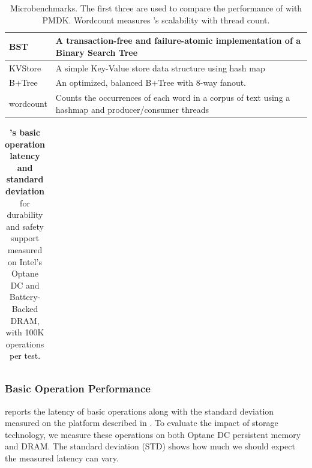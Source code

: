 \begin{table}
      \center
      \footnotesize
    \begin{tabular}{|p{0.5in}|p{2.5in}|}
        \hline
        BST & A transaction-free and failure-atomic implementation of a Binary Search Tree \\ \hline
        KVStore & A simple Key-Value store data structure using hash map \\ \hline
        B+Tree & An optimized, balanced B+Tree with 8-way fanout.  \\ \hline
        wordcount & Counts the occurrences of each word in a corpus of text using a hashmap and producer/consumer threads\\\hline
    \end{tabular}
    \caption{Microbenchmarks. The first three are used to compare the performance of \this{} with PMDK. Wordcount measures \this{}'s scalability with thread count.}
    \label{tab:perf:wrkld}
\end{table}


\begin{table}
  \center
  \footnotesize
  \begin{tabular}{|l||c|c||c|c|}\hline
    
  \end{tabular}
  \caption{\textbf{\This's basic operation latency and standard deviation} for durability and safety support measured on Intel's Optane DC and Battery-Backed DRAM, with 100K operations per test.
  }
  \label{tab:microbench}
\end{table}

\subsubsection{Basic Operation Performance}

 reports the latency of basic operations along with the standard deviation measured on the platform described in . To evaluate the impact of storage technology, we measure these operations on both Optane DC persistent memory and DRAM. The standard deviation (STD) shows how much we should expect the measured latency can vary.

